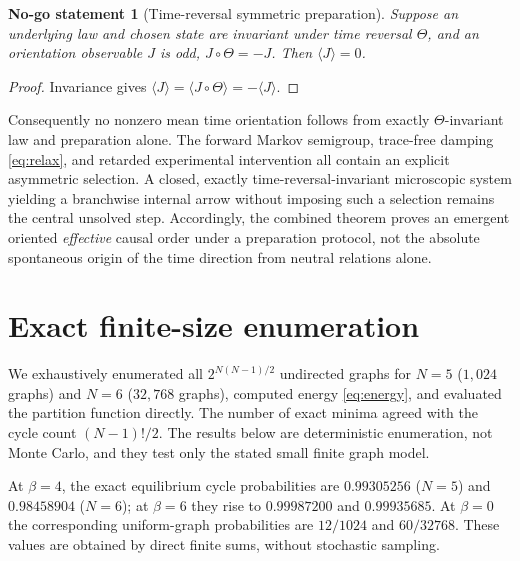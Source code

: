 \documentclass[11pt,a4paper]{article}
\numberwithin{equation}{section}
\newtheorem{nogo}[theorem]{No-go statement}
\newcommand{\1}{\mathbf{1}}
\begin{document}
\begin{nogo}[Time-reversal symmetric preparation]\label{nogo:time}
Suppose an underlying law and chosen state are invariant under time reversal $\Theta$, and an orientation observable $J$ is odd, $J\circ\Theta=-J$. Then $\langle J\rangle=0$.
\end{nogo}
\begin{proof}
Invariance gives $\langle J\rangle=\langle J\circ\Theta\rangle=-\langle J\rangle$.
\end{proof}
Consequently no nonzero mean time orientation follows from exactly $\Theta$-invariant law and preparation alone. The forward Markov semigroup, trace-free damping \eqref{eq:relax}, and retarded experimental intervention all contain an explicit asymmetric selection. A closed, exactly time-reversal-invariant microscopic system yielding a branchwise internal arrow without imposing such a selection remains the central unsolved step. Accordingly, the combined theorem proves an emergent oriented \emph{effective} causal order under a preparation protocol, not the absolute spontaneous origin of the time direction from neutral relations alone.

\section{Exact finite-size enumeration}
We exhaustively enumerated all $2^{N(N-1)/2}$ undirected graphs for $N=5$ ($1{,}024$ graphs) and $N=6$ ($32{,}768$ graphs), computed energy \eqref{eq:energy}, and evaluated the partition function directly. The number of exact minima agreed with the cycle count $(N-1)!/2$. The results below are deterministic enumeration, not Monte Carlo, and they test only the stated small finite graph model.

At $\beta=4$, the exact equilibrium cycle probabilities are $0.99305256$ ($N=5$) and $0.98458904$ ($N=6$); at $\beta=6$ they rise to $0.99987200$ and $0.99935685$. At $\beta=0$ the corresponding uniform-graph probabilities are $12/1024$ and $60/32768$. These values are obtained by direct finite sums, without stochastic sampling.
\end{document}
